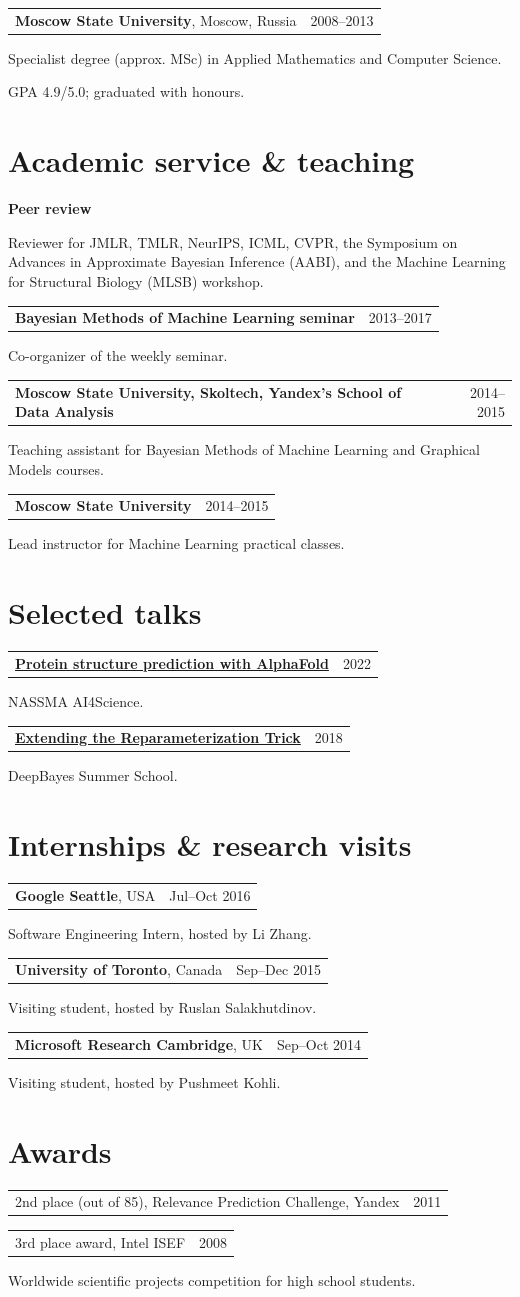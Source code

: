 \documentclass[10pt,a4paper]{article}
\makeatletter
\newcommand{\dated}[2]{\par\begin{tabularx}{\linewidth}{@{}Xr@{}}#1 & {\small\color{muted}#2}\end{tabularx}\par}
\makeatother
\begin{document}
\vspace{5pt}
\dated{\textbf{Moscow State University}, Moscow, Russia}{2008--2013}
Specialist degree (approx. MSc) in Applied Mathematics and Computer Science.\par
GPA 4.9/5.0; graduated with honours.

\section*{Academic service \& teaching}
\textbf{Peer review}\par
Reviewer for JMLR, TMLR, NeurIPS, ICML, CVPR, the Symposium on Advances in
Approximate Bayesian Inference (AABI), and the Machine Learning for Structural
Biology (MLSB) workshop.

\vspace{5pt}
\dated{\textbf{Bayesian Methods of Machine Learning seminar}}{2013--2017}
Co-organizer of the weekly seminar.

\vspace{3pt}
\dated{\textbf{Moscow State University, Skoltech, Yandex's School of Data Analysis}}{2014--2015}
Teaching assistant for Bayesian Methods of Machine Learning and Graphical Models courses.

\vspace{3pt}
\dated{\textbf{Moscow State University}}{2014--2015}
Lead instructor for Machine Learning practical classes.

\section*{Selected talks}
\dated{\href{https://youtu.be/NdI8oUeb-7A}{\textbf{Protein structure prediction with AlphaFold}}}{2022}
NASSMA AI4Science.\par
\vspace{4pt}
\dated{\href{https://youtu.be/BV465lgleHA}{\textbf{Extending the Reparameterization Trick}}}{2018}
DeepBayes Summer School.

\section*{Internships \& research visits}
\dated{\textbf{Google Seattle}, USA}{Jul--Oct 2016}
Software Engineering Intern, hosted by Li Zhang.

\vspace{4pt}
\dated{\textbf{University of Toronto}, Canada}{Sep--Dec 2015}
Visiting student, hosted by Ruslan Salakhutdinov.

\vspace{4pt}
\dated{\textbf{Microsoft Research Cambridge}, UK}{Sep--Oct 2014}
Visiting student, hosted by Pushmeet Kohli.

\section*{Awards}
\dated{2nd place (out of 85), Relevance Prediction Challenge, Yandex}{2011}
\dated{3rd place award, Intel ISEF}{2008}
Worldwide scientific projects competition for high school students.\par
\end{document}
